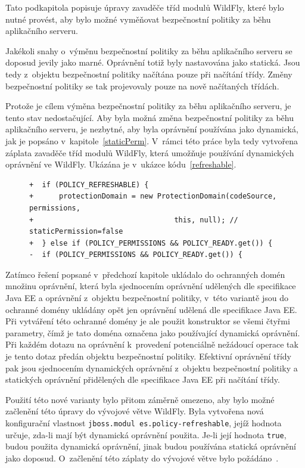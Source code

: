 Tato podkapitola popisuje úpravy zavaděče tříd modulů WildFly, které bylo nutné provést, aby bylo možné vyměňovat bezpečnostní politiky za běhu aplikačního serveru.

Jakékoli snahy o~výměnu bezpečnostní politiky za běhu aplikačního serveru se doposud jevily jako marné. Oprávnění totiž byly nastavována jako statická.
Jsou tedy z~objektu bezpečnostní politiky načítána pouze při načítání třídy. Změny bezpečnostní politiky se tak projevovaly pouze na nově načítaných třídách.

Protože je cílem výměna bezpečnostní politiky za běhu aplikačního serveru, je tento stav nedostačující.
Aby byla možná změna bezpečnostní politiky za běhu aplikačního serveru, je nezbytné, aby byla oprávnění používána jako dynamická, jak je popsáno v~kapitole~\ref{staticPerm}.
V~rámci této práce byla tedy vytvořena záplata zavaděče tříd modulů WildFly, která umožňuje používání dynamických oprávnění ve WildFly. Ukázána je v~ukázce kódu~\ref{refreshable}.

\begin{figure}[tb]
\begin{lstlisting}[caption=Hlavní část záplaty umožňující nastavit používání dynamických oprávnění, label=refreshable]
+  if (POLICY_REFRESHABLE) {
+      protectionDomain = new ProtectionDomain(codeSource, permissions,
+                                 this, null); // staticPermission=false
+  } else if (POLICY_PERMISSIONS && POLICY_READY.get()) {
-  if (POLICY_PERMISSIONS && POLICY_READY.get()) {
\end{lstlisting}
\end{figure}

Zatímco řešení popsané v~předchozí kapitole ukládalo do ochranných domén množinu oprávnění,
která byla sjednocením oprávnění udělených dle specifikace Java EE a oprávnění z~objektu bezpečnostní politiky,
v~této variantě jsou do ochranné domény ukládány opět jen oprávnění udělená dle specifikace Java EE.
Při vytváření této ochranné domény je ale použit konstruktor se všemi čtyřmi parametry, čímž je tato doména označena jako používající dynamická oprávnění.
Při každém dotazu na oprávnění k~provedení potenciálně nežádoucí operace tak je tento dotaz předán objektu bezpečnostní politiky.
Efektivní oprávnění třídy pak jsou sjednocením dynamických oprávnění z~objektu bezpečnostní politiky a statických oprávnění přidělených dle specifikace Java EE při načítání třídy.

Použití této nové varianty bylo přitom záměrně omezeno, aby bylo možné začlenění této úpravy do vývojové větve WildFly.
Byla vytvořena nová konfigurační vlastnost {\tt jboss.modul es.policy-refreshable}, jejíž hodnota určuje, zda-li mají být dynamická oprávnění použita.
Je-li její hodnota {\tt true}, budou použita dynamická oprávnění, jinak budou používána statická oprávnění jako doposud.
O~začlenění této záplaty do vývojové větve bylo požádáno~\cite{jmPullRequest}.

